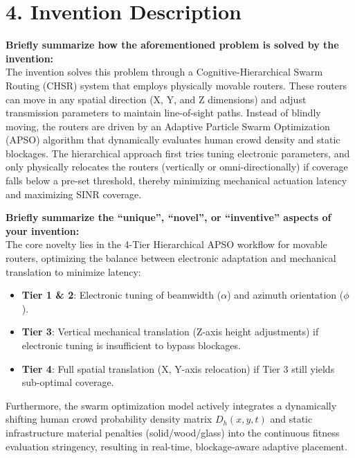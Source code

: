 \documentclass[11pt, a4paper]{article}
\begin{document}
\section*{4. Invention Description}
\textbf{Briefly summarize how the aforementioned problem is solved by the invention:} \\
The invention solves this problem through a Cognitive-Hierarchical Swarm Routing (CHSR) system that employs physically movable routers. These routers can move in any spatial direction (X, Y, and Z dimensions) and adjust transmission parameters to maintain line-of-sight paths. Instead of blindly moving, the routers are driven by an Adaptive Particle Swarm Optimization (APSO) algorithm that dynamically evaluates human crowd density and static blockages. The hierarchical approach first tries tuning electronic parameters, and only physically relocates the routers (vertically or omni-directionally) if coverage falls below a pre-set threshold, thereby minimizing mechanical actuation latency and maximizing SINR coverage.

\vspace{0.5cm}
\noindent\textbf{Briefly summarize the ``unique'', ``novel'', or ``inventive'' aspects of your invention:} \\
The core novelty lies in the 4-Tier Hierarchical APSO workflow for movable routers, optimizing the balance between electronic adaptation and mechanical translation to minimize latency:
\begin{itemize}
    \item \textbf{Tier 1 \& 2}: Electronic tuning of beamwidth ($\alpha$) and azimuth orientation ($\phi$).
    \item \textbf{Tier 3}: Vertical mechanical translation (Z-axis height adjustments) if electronic tuning is insufficient to bypass blockages.
    \item \textbf{Tier 4}: Full spatial translation (X, Y-axis relocation) if Tier 3 still yields sub-optimal coverage.
\end{itemize}
Furthermore, the swarm optimization model actively integrates a dynamically shifting human crowd probability density matrix $D_h(x,y,t)$ and static infrastructure material penalties (solid/wood/glass) into the continuous fitness evaluation stringency, resulting in real-time, blockage-aware adaptive placement.
\end{document}
